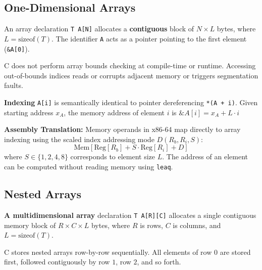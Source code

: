 \subsection{One-Dimensional Arrays}

\begin{definition}
    An array declaration \texttt{T A[N]} allocates a \textbf{contiguous} block of $N \times L$ bytes, where $L = \text{sizeof}(T)$. The identifier \texttt{A} acts as a pointer pointing to the first element (\texttt{\&A[0]}).
\end{definition}

\begin{important}
    C does not perform array bounds checking at compile-time or runtime. Accessing out-of-bounds indices reads or corrupts adjacent memory or triggers segmentation faults.
\end{important}

\begin{definition}
    \textbf{Indexing} \texttt{A[i]} is semantically identical to pointer dereferencing \texttt{*(A + i)}. Given starting address $x_A$, the memory address of element $i$ is $\&A[i] = x_A + L \cdot i$
\end{definition}

\begin{remark}
    \textbf{Assembly Translation:} Memory operands in x86-64 map directly to array indexing using the scaled index addressing mode $D(R_b, R_i, S)$:
    $$\text{Mem}[\text{Reg}[R_b] + S \cdot \text{Reg}[R_i] + D]$$
    where $S \in \{1, 2, 4, 8\}$ corresponds to element size $L$. The address of an element can be computed without reading memory using \texttt{leaq}.
\end{remark}


\subsection{Nested Arrays}

\begin{definition}
    \textbf{A multidimensional array} declaration \texttt{T A[R][C]} allocates a single contiguous memory block of $R \times C \times L$ bytes, where $R$ is rows, $C$ is columns, and $L = \text{sizeof}(T)$.
\end{definition}

\begin{remark}
     C stores nested arrays row-by-row sequentially. All elements of row $0$ are stored first, followed contiguously by row $1$, row $2$, and so forth.
\end{remark}

